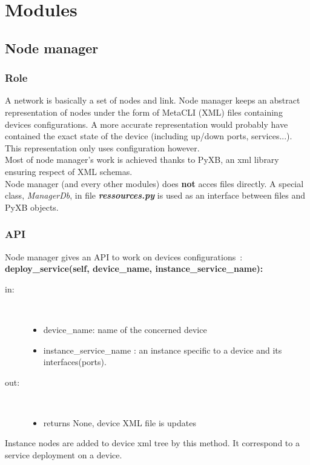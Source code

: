 \section{Modules}
\subsection{Node manager}
\subsubsection{Role}
A network is basically a set of nodes and link. Node manager keeps an abstract
representation of nodes under the form of MetaCLI (XML) files containing devices
configurations. A more accurate representation would probably have contained the
exact state of the device (including up/down ports, services...). This
representation only uses configuration however.\\
Most of node manager's work is achieved thanks to PyXB, an xml library ensuring respect of XML 
schemas.\\
Node manager (and every other modules) does \textbf{not} acces files directly.
A special class, \emph{ManagerDb}, in file \emph{\textbf{ressources.py}} is used as
an interface between files and PyXB objects.\\
\subsubsection{API}
Node manager gives an API to work on devices configurations~:\\[1\baselineskip]

\textbf{deploy\_service(self, device\_name, instance\_service\_name):}
\begin{description}
    \item[in:] \hfill \\
        \begin{itemize}
            \item device\_name: name of the concerned device
            \item instance\_service\_name : an instance specific to a device and its interfaces(ports).
        \end{itemize}
    \item[out:] \hfill \\
        \begin{itemize}
            \item returns None, device XML file is updates
        \end{itemize}
\end{description}
Instance nodes are added to device xml tree by this method. It correspond to a service deployment on a device.\\


